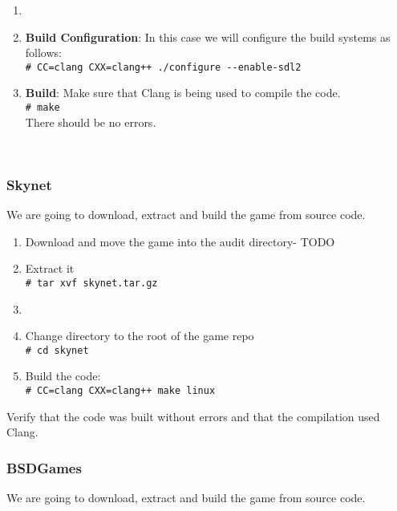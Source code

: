 \begin{enumerate}
	\item {}
	\item\textbf{ Build Configuration}: In this case we will configure the build systems as follows:\\
	\verb|# CC=clang CXX=clang++ ./configure --enable-sdl2|
	\item \textbf{Build}: Make sure that Clang is being used to compile the code.\\
	\verb|# make| \\
	There should be no errors.
\end{enumerate}\

\subsubsection{Skynet}

We are going to download, extract and build the game from source code.


\begin{enumerate}
	\itemsep0em
	\item Download and move the game into the audit directory- TODO 
	\item Extract it\\
	\verb|# tar xvf skynet.tar.gz|
	\item {}
	\item Change directory to the root of the game repo	\\
	\verb|# cd skynet|	
	\item Build the code:\\
	\verb|# CC=clang CXX=clang++ make linux|
\end{enumerate}

Verify that the code was built without errors and that the compilation used Clang.

\subsubsection{BSDGames}

We are going to download, extract and build the game from source code.


